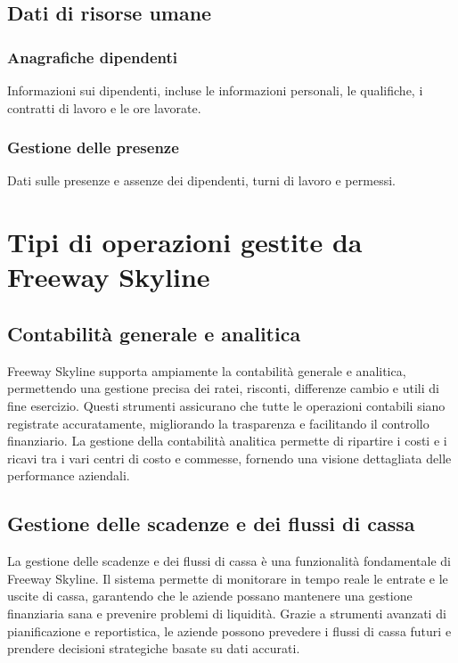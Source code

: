 \documentclass{article}
\begin{document}
\subsection{Dati di risorse umane}
\subsubsection{Anagrafiche dipendenti}
Informazioni sui dipendenti, incluse le informazioni personali, le qualifiche, i contratti di lavoro e le ore lavorate.
\subsubsection{Gestione delle presenze}
Dati sulle presenze e assenze dei dipendenti, turni di lavoro e permessi.

\section{Tipi di operazioni gestite da Freeway Skyline}

\subsection{Contabilità generale e analitica}

Freeway Skyline supporta ampiamente la contabilità generale e analitica, permettendo una gestione precisa dei ratei, risconti, differenze cambio e utili di fine esercizio. Questi strumenti assicurano che tutte le operazioni contabili siano registrate accuratamente, migliorando la trasparenza e facilitando il controllo finanziario. La gestione della contabilità analitica permette di ripartire i costi e i ricavi tra i vari centri di costo e commesse, fornendo una visione dettagliata delle performance aziendali.

\subsection{Gestione delle scadenze e dei flussi di cassa}

La gestione delle scadenze e dei flussi di cassa è una funzionalità fondamentale di Freeway Skyline. Il sistema permette di monitorare in tempo reale le entrate e le uscite di cassa, garantendo che le aziende possano mantenere una gestione finanziaria sana e prevenire problemi di liquidità. Grazie a strumenti avanzati di pianificazione e reportistica, le aziende possono prevedere i flussi di cassa futuri e prendere decisioni strategiche basate su dati accurati.
\end{document}
